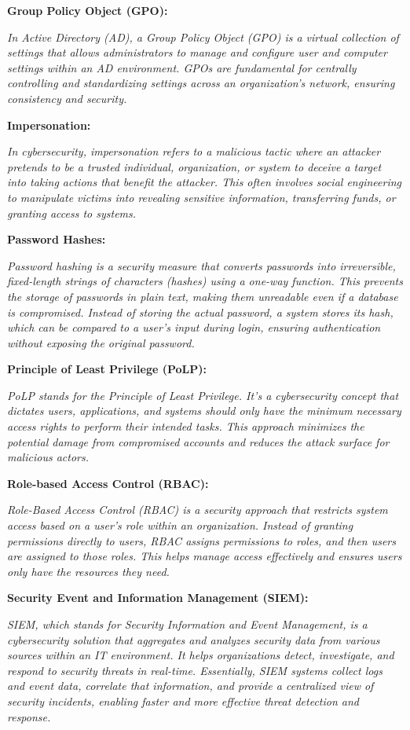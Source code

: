 \textbf{Group Policy Object (GPO):}

\textit{In Active Directory (AD), a Group Policy Object (GPO) is a virtual collection of settings that allows administrators to manage and configure user and computer settings within an AD environment. GPOs are fundamental for centrally controlling and standardizing settings across an organization's network, ensuring consistency and security.}

\textbf{Impersonation:}

\textit{In cybersecurity, impersonation refers to a malicious tactic where an attacker pretends to be a trusted individual, organization, or system to deceive a target into taking actions that benefit the attacker. This often involves social engineering to manipulate victims into revealing sensitive information, transferring funds, or granting access to systems.}

\textbf{Password Hashes:}

\textit{Password hashing is a security measure that converts passwords into irreversible, fixed-length strings of characters (hashes) using a one-way function. This prevents the storage of passwords in plain text, making them unreadable even if a database is compromised. Instead of storing the actual password, a system stores its hash, which can be compared to a user's input during login, ensuring authentication without exposing the original password.}

\textbf{Principle of Least Privilege (PoLP):}

\textit{PoLP stands for the Principle of Least Privilege. It's a cybersecurity concept that dictates users, applications, and systems should only have the minimum necessary access rights to perform their intended tasks. This approach minimizes the potential damage from compromised accounts and reduces the attack surface for malicious actors.}

\textbf{Role-based Access Control (RBAC):}

\textit{Role-Based Access Control (RBAC) is a security approach that restricts system access based on a user's role within an organization. Instead of granting permissions directly to users, RBAC assigns permissions to roles, and then users are assigned to those roles. This helps manage access effectively and ensures users only have the resources they need.}

\textbf{Security Event and Information Management (SIEM):}

\textit{SIEM, which stands for Security Information and Event Management, is a cybersecurity solution that aggregates and analyzes security data from various sources within an IT environment. It helps organizations detect, investigate, and respond to security threats in real-time. Essentially, SIEM systems collect logs and event data, correlate that information, and provide a centralized view of security incidents, enabling faster and more effective threat detection and response.}

